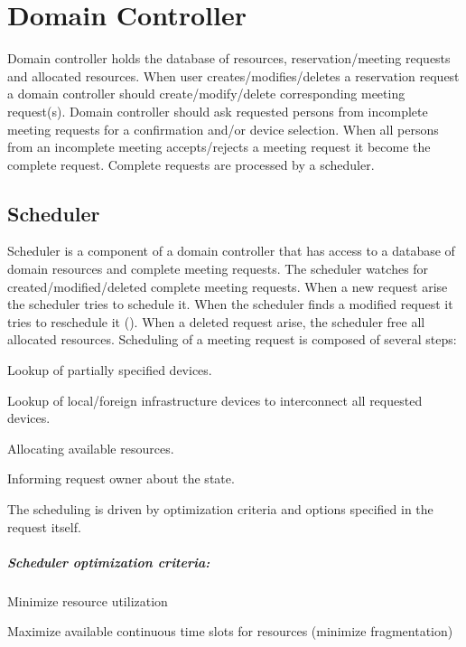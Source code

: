 \chapter{Domain Controller}

Domain controller holds the database of resources, reservation/meeting requests 
and allocated resources. When user creates/modifies/deletes a reservation 
request a domain controller should create/modify/delete corresponding meeting 
request(s). Domain controller should ask requested persons from incomplete 
meeting requests for a confirmation and/or device selection. When all persons 
from an incomplete meeting accepts/rejects a meeting request it become the
complete request. Complete requests are processed by a scheduler.

\section{Scheduler}

Scheduler is a component of a domain controller that has access to a database 
of domain resources and complete meeting requests. The scheduler watches for
created/modified/deleted complete meeting requests. When a new request arise
the scheduler tries to schedule it. When the scheduler finds a modified request
it tries to reschedule it (). When 
a deleted request arise, the scheduler free all allocated resources. Scheduling of a meeting request is composed of several steps:
\begin{compactenum}
\item Lookup of partially specified devices.
\item Lookup of local/foreign infrastructure devices to interconnect all requested devices.
\item Allocating available resources.
\item Informing request owner about the state.
\end{compactenum}
The scheduling is driven by optimization criteria and options specified in the request itself.


\paragraph{Scheduler optimization criteria:}
\begin{compactitem}
\item Minimize resource utilization
\item Maximize available continuous time slots for resources (minimize 
  fragmentation)
\end{compactitem}

